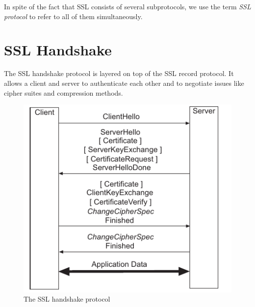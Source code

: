 \documentclass[a4paper,12pt]{report}
\begin{document}
In spite of the fact that SSL consists of several subprotocols, we use the term \emph{SSL protocol} to refer to all of them simultaneously.

\section{SSL Handshake}
The SSL handshake protocol is layered on top of the SSL record protocol. It allows a client and server to authenticate each other and to negotiate issues like cipher suites and compression methods.

\begin{figure}[H]
    \centering
    \includegraphics[scale=0.7]{handshake.png}
    \caption{The SSL handshake protocol}
    
\end{figure}
\end{document}
